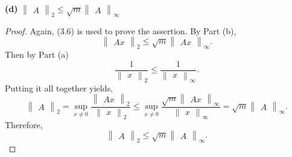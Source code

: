 \documentclass{article}
\begin{document}
\textbf{(d)}         
$\begin{Vmatrix}
    A
\end{Vmatrix}_{2} \leq \sqrt{m}
\begin{Vmatrix}
    A
\end{Vmatrix}_{\infty}$
\begin{proof}
    Again, (3.6) is used to prove the assertion.
    By Part (b),
    \[
        \begin{Vmatrix}
            Ax
        \end{Vmatrix}_{2}
        \leq
        \sqrt{m}
        \begin{Vmatrix}
            Ax
        \end{Vmatrix}_{\infty}. 
        \]
        Then by Part (a)
        \[
    \frac{
        1
    }{
        \begin{Vmatrix}
            x
        \end{Vmatrix}_{2}
    } 
    \leq 
    \frac{
        1
    }{
        \begin{Vmatrix}
            x
        \end{Vmatrix}_{\infty}
    }.
    \]
    Putting it all together yields,
    \[
        \begin{Vmatrix}
            A
        \end{Vmatrix}_{2}
        =
        \sup_{x \neq 0}
        \frac{
            \begin{Vmatrix}
                Ax
            \end{Vmatrix}_{2}
        }{
            \begin{Vmatrix}
                x
            \end{Vmatrix}_{2}
        } 
        \leq 
        \sup_{x \neq 0}
        \frac{
            \sqrt{m}
            \begin{Vmatrix}
                Ax
            \end{Vmatrix}_{\infty}
        }{
            \begin{Vmatrix}
                x
            \end{Vmatrix}_{\infty}
        } 
        =
        \sqrt{m}
        \begin{Vmatrix}
            A
        \end{Vmatrix}_{\infty}.
    \]
        Therefore,   \[
            \begin{Vmatrix}
                A
            \end{Vmatrix}_{2}
            \leq
            \sqrt{m}
            \begin{Vmatrix}
                A
            \end{Vmatrix}_{\infty}. 
            \]
\end{proof}
\end{document}
